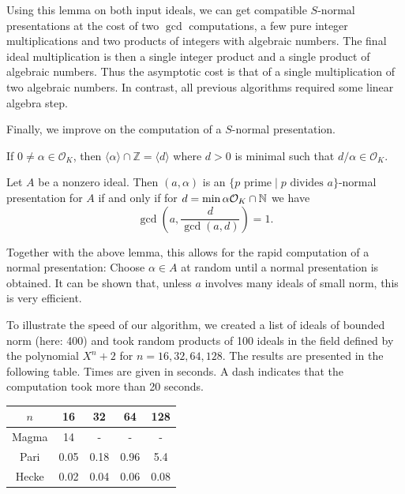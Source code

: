 \documentclass{sig-alternate-05-2015}
\begin{document}
Using this lemma on both input ideals, we can get compatible $S$-normal 
presentations at the cost of two $\gcd$ computations, a few pure integer multiplications and two products of integers with algebraic numbers. The final ideal
multiplication is then a single integer product and a single product of
algebraic numbers. Thus the asymptotic cost is that of a single multiplication of two algebraic numbers.
In contrast, all previous algorithms required some linear algebra step.

Finally, we improve on the computation of a $S$-normal presentation.

\begin{lemma}
If $0\ne\alpha\in \mathcal O_K$, then $\langle\alpha\rangle\cap \mathbb Z = \langle d\rangle$ where $d>0$ is minimal such that $d/\alpha\in \mathcal O_K$.
\end{lemma}

\begin{theorem}
Let $A$ be a nonzero ideal. Then
$(a, \alpha)$ is an $\{p \text{ prime} \mid p \text{ divides }a\}$-normal presentation for $A$ if and only if
for $d = \min \alpha\mathcal O_K \cap \mathbb{N}$ we have
\[ \gcd(a, \frac{d}{\gcd(a, d)}) = 1.\]
\end{theorem}

Together with the above lemma, this allows for the rapid computation of a
normal presentation: Choose $\alpha\in A$ at random until a normal presentation
is obtained. It can be shown that, unless $a$ involves many ideals of small
norm, this is very efficient.

To illustrate the speed of our algorithm, we created a list of ideals of bounded norm (here: 400) and
took random products of 100 ideals in the field
defined by the polynomial $X^n + 2$ for $n=16, 32, 64, 128$.
The results are presented in the following table.
Times are given in seconds. A dash indicates that the computation took  more than 20 seconds.
\begin{center}
\begin{tabular}{c||c|c|c|c}
$n$ & 16 & 32 & 64 & 128 \\\hline
Magma & 14 & -& - & -        \\
Pari & 0.05 & 0.18 & 0.96 & 5.4 \\
Hecke & 0.02 & 0.04 & 0.06 & 0.08
\end{tabular}
\end{center}

\end{document}
